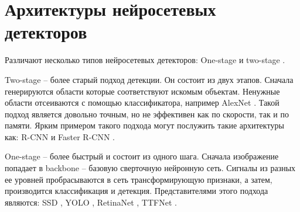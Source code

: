 \section{Архитектуры нейросетевых детекторов}

Различают несколько типов нейросетевых детекторов: One-stage и two-stage \cite{lib-detector-types}.

Two-stage -- более старый подход детекции. Он состоит из двух этапов. Сначала генерируются области которые соответствуют искомым объектам. Ненужные области отсеиваются с помощью классификатора, например AlexNet \cite{lib-alexnet}. Такой подход является довольно точным, но не эффективен как по скорости, так и по памяти. Ярким примером такого подхода могут послужить такие архитектуры как: R-CNN и Faster R-CNN \cite{lib-rcnn}.

One-stage -- более быстрый и состоит из одного шага. Сначала изображение попадает в backbone -- базовую сверточную нейронную сеть. Сигналы из разных ее уровней пробрасываются в сеть трансформирующую признаки, а затем, производится классификация и детекция. Представителями этого подхода являются: SSD \cite{lib-ssd}, YOLO \cite{lib-yolo}, RetinaNet \cite{lib-retinanet}, TTFNet \cite{lib-ttfnet}.



\clearpage